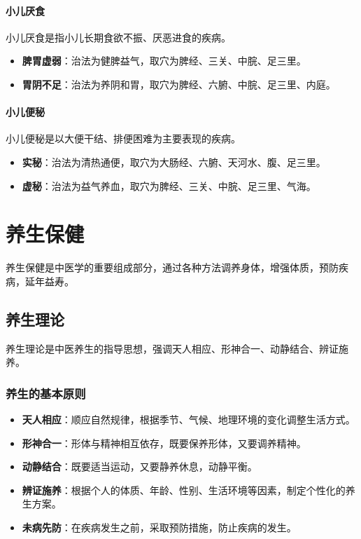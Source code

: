 \documentclass[12pt,UTF8]{ctexbook}
\begin{document}
\subsubsection{小儿厌食}

小儿厌食是指小儿长期食欲不振、厌恶进食的疾病。

\begin{itemize}
\item \textbf{脾胃虚弱}：治法为健脾益气，取穴为脾经、三关、中脘、足三里。
\item \textbf{胃阴不足}：治法为养阴和胃，取穴为脾经、六腑、中脘、足三里、内庭。
\end{itemize}

\subsubsection{小儿便秘}

小儿便秘是以大便干结、排便困难为主要表现的疾病。

\begin{itemize}
\item \textbf{实秘}：治法为清热通便，取穴为大肠经、六腑、天河水、腹、足三里。
\item \textbf{虚秘}：治法为益气养血，取穴为脾经、三关、中脘、足三里、气海。
\end{itemize}

\chapter{养生保健}

养生保健是中医学的重要组成部分，通过各种方法调养身体，增强体质，预防疾病，延年益寿。

\section{养生理论}

养生理论是中医养生的指导思想，强调天人相应、形神合一、动静结合、辨证施养。

\subsection{养生的基本原则}

\begin{itemize}
\item \textbf{天人相应}：顺应自然规律，根据季节、气候、地理环境的变化调整生活方式。
\item \textbf{形神合一}：形体与精神相互依存，既要保养形体，又要调养精神。
\item \textbf{动静结合}：既要适当运动，又要静养休息，动静平衡。
\item \textbf{辨证施养}：根据个人的体质、年龄、性别、生活环境等因素，制定个性化的养生方案。
\item \textbf{未病先防}：在疾病发生之前，采取预防措施，防止疾病的发生。
\end{itemize}
\end{document}

